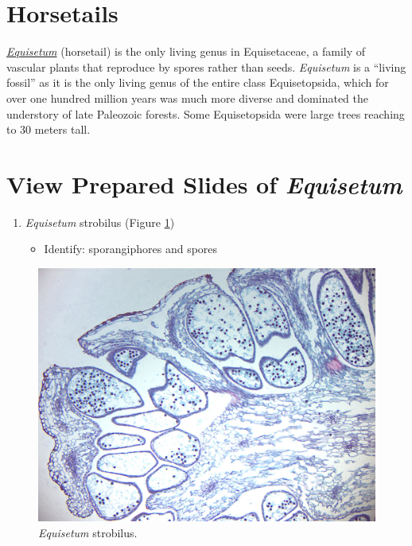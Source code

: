\section{Horsetails}\label{horsetails}

\href{https://en.wikipedia.org/wiki/Equisetum}{\emph{Equisetum}}
(horsetail) is the only living genus in Equisetaceae, a family of
vascular plants that reproduce by spores rather than seeds. \emph{Equisetum} is
a ``living fossil'' as it is the only living genus of the entire class
Equisetopsida, which for over one hundred million years was much more
diverse and dominated the understory of late Paleozoic forests. Some
Equisetopsida were large trees reaching to 30 meters tall.

\section{View Prepared Slides of
\emph{Equisetum}}\label{view-prepared-slides-of-equisetum}

\begin{enumerate}
\def\labelenumi{\arabic{enumi}.}
\tightlist
\item
  \emph{Equisetum} strobilus (Figure \ref{fig:equisetumstrobilus})

  \begin{itemize}
  \tightlist
  \item
    Identify: sporangiphores and spores
  \end{itemize}
\end{enumerate}

\begin{figure}

{\centering \includegraphics[width=0.7\linewidth]{./figures/mosses/equisetum_strobilus}

}

\caption{\emph{Equisetum} strobilus.}\label{fig:equisetumstrobilus}
\end{figure}

